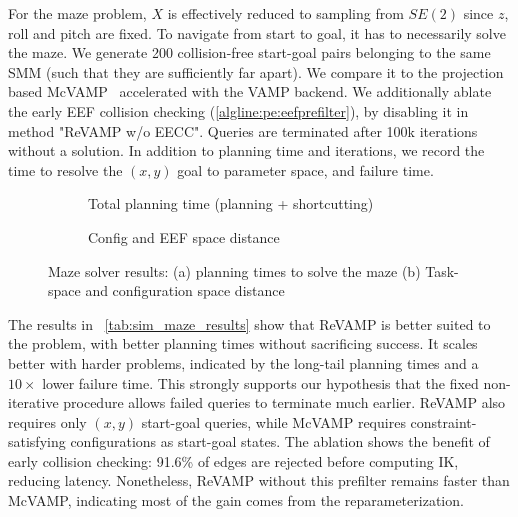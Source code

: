 \documentclass[letterpaper, 10 pt, conference]{ieeeconf}
\begin{document}
For the maze problem, $X$ is effectively reduced to sampling from $SE(2)$ since $z$, roll and pitch are fixed. To navigate from start to goal, it has to necessarily solve the maze. We generate 200 collision-free start-goal pairs belonging to the same SMM (such that they are sufficiently far apart). We compare it to the projection based McVAMP~\cite{iyer2026vectorizing} accelerated with the VAMP backend. We additionally ablate the early EEF collision checking (\cref{algline:pe:eefprefilter}), by disabling it in method "ReVAMP w/o EECC". Queries are terminated after 100k iterations without a solution. In addition to planning time and iterations, we record the time to resolve the $(x,y)$ goal to parameter space, and failure time.



\begin{figure}[h]
\centering
\begin{subfigure}[b]{0.75\linewidth}
    \centering
    
    \caption{Total planning time (planning + shortcutting)}
    \vspace{0.5em}
    \label{tab:maze_time}
\end{subfigure}

\begin{subfigure}[b]{0.85\linewidth}
    \centering
    
    \caption{Config and EEF space distance}
    \label{tab:maze_distance}
\end{subfigure}
\caption{Maze solver results: (a) planning times to solve the maze (b) Task-space and configuration space distance}
\label{tab:maze_results}
\vspace{-1em}
\end{figure}


The results in ~\cref{tab:sim_maze_results} show that ReVAMP is better suited to the problem, with better planning times without sacrificing success. It scales better with harder problems, indicated by the long-tail planning times and a $10\times$ lower failure time. This strongly supports our hypothesis that the fixed non-iterative procedure allows failed queries to terminate much earlier. 
ReVAMP also requires only $(x,y)$ start-goal queries, while McVAMP requires constraint-satisfying configurations as start-goal states.  The ablation shows the benefit of early collision checking: 91.6\% of edges are rejected before computing IK, reducing latency. Nonetheless, ReVAMP without this prefilter remains faster than McVAMP, indicating most of the gain comes from the reparameterization.
\end{document}
